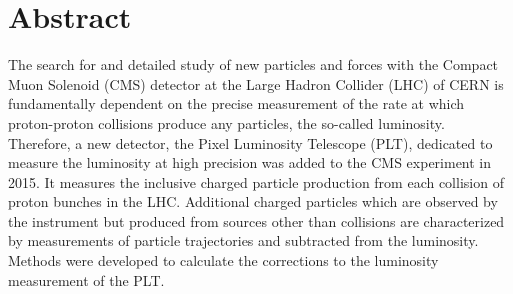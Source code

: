 \chapter*{Abstract}\label{ch:abstract}
The search for and detailed study of new particles and forces with the Compact Muon Solenoid (CMS) detector at the Large Hadron Collider (LHC) of CERN is fundamentally dependent on the precise measurement of the rate at which proton-proton collisions produce any particles, the so-called luminosity. 
Therefore, a new detector, the Pixel Luminosity Telescope (PLT), dedicated to measure the luminosity at high precision was added to the CMS experiment in 2015.
It measures the inclusive charged particle production from each collision of proton bunches in the LHC. 
Additional charged particles which are observed by the instrument but produced from sources other than collisions are characterized by measurements of particle trajectories and subtracted from the luminosity.
Methods were developed to calculate the corrections to the luminosity measurement of the PLT.
